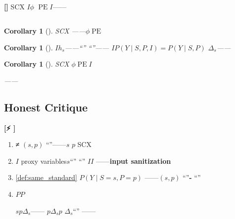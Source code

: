 \documentclass[11pt,a4paper]{article}
\DeclareMathOperator{\PE}{PE}
\newtheorem{corollary}[theorem]{Corollary}
\theoremstyle{remark}
\newcommand{\rigorous}{\textnormal{\textbf{[]}}}
\newcommand{\honestwarning}{\textnormal{\textbf{[⚡ ]}}}
\begin{document}
\rigorous{} \textbf{}SCX
$I$$\phi$
$\PE$$I$——
\textbf{}

\subsection{}

\begin{corollary}[]
\label{cor:treat_like_alike}
SCX
\textbf{}——$\phi$$\PE$


\end{corollary}

\begin{corollary}[]
\label{cor:injection_risk}
$I$$h_s$——``''
``''——
$I$$P(Y \mid S, P, I) = P(Y \mid S, P)$
$\Delta_s$——\textbf{
}
\end{corollary}

\begin{corollary}[]
\label{cor:auditability}
SCX\textbf{}\textbf{}
$\phi$$\PE$$I$

——\textbf{}
\end{corollary}

\subsection{Honest Critique}

\honestwarning{} \textbf{}

\begin{enumerate}[label=(\arabic*)]
    \item \textbf{ ≠ }\textbf{
          $(s, p)$}
          ``''——$s$
          $p$\textbf{}
          SCX

    \item \textbf{}$I$\textbf{}
          proxy variables$s$``''
          ``''
          $I$$I$
          ——\textbf{input sanitization
          }

    \item \textbf{}\ref{def:same_standard}
          $P(Y \mid S=s, P=p)$\textbf{}
          ——$(s, p)$
          ``''\textbf{-}
          ``''

    \item \textbf{$P$}$P$
          
          $s$$p$$\Delta_s$——
          $p$$\Delta_s$\textbf{}$p$
          $\Delta_s$``''
          ——\textbf{}\textbf{}
\end{enumerate}

\end{document}
